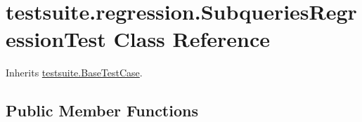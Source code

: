 \hypertarget{classtestsuite_1_1regression_1_1_subqueries_regression_test}{}\section{testsuite.\+regression.\+Subqueries\+Regression\+Test Class Reference}
\label{classtestsuite_1_1regression_1_1_subqueries_regression_test}


Inherits \mbox{\hyperlink{classtestsuite_1_1_base_test_case}{testsuite.\+Base\+Test\+Case}}.

\subsection*{Public Member Functions}
